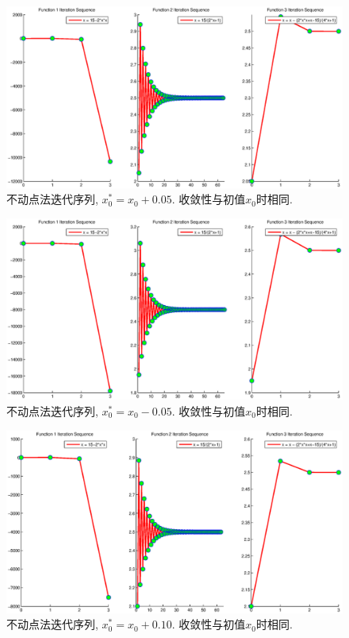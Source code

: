 \documentclass{article}
\begin{document}
\begin{CJK*}{UTF8}{song}
				\begin{figure}[H]
					\centering
					\includegraphics[width=1.0\textwidth]{../chapter2_1_0_1.eps}
					\caption{不动点法迭代序列, $x_0^{*} = x_0 + 0.05$. 收敛性与初值$x_0$时相同.}
					\label{img_chapter2_1_0_1}
				\end{figure}
			
				\begin{figure}[H]
					\centering
					\includegraphics[width=1.0\textwidth]{../chapter2_1_0_2.eps}
					\caption{不动点法迭代序列, $x_0^{*} = x_0 - 0.05$. 收敛性与初值$x_0$时相同.}
					\label{img_chapter2_1_0_2}
				\end{figure}
				
				\begin{figure}[H]
					\centering
					\includegraphics[width=1.0\textwidth]{../chapter2_1_0_3.eps}
					\caption{不动点法迭代序列, $x_0^{*} = x_0 + 0.10$. 收敛性与初值$x_0$时相同.}
					\label{img_chapter2_1_0_3}
				\end{figure}
				

\end{CJK*}
\end{document}

